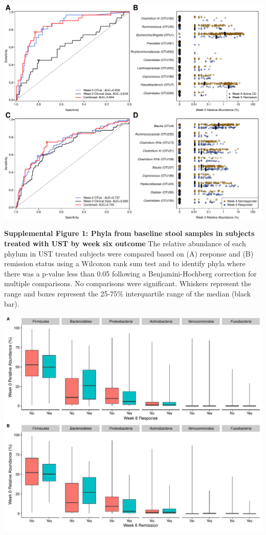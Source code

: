 \documentclass[12pt,]{article}
\begin{document}
\includegraphics{figures/Figure2_wk0Xwk6pred.pdf}

\newpage

\textbf{Supplemental Figure 1: Phyla from baseline stool samples in
subjects treated with UST by week six outcome} The relative abundance of
each phylum in UST treated subjects were compared based on (A) response
and (B) remission status using a Wilcoxon rank sum test and to identify
phyla where there was a p-value less than 0.05 following a
Benjamini-Hochberg correction for multiple comparisons. No comparisons
were significant. Whiskers represent the range and boxes represent the
25-75\% interquartile range of the median (black bar).

\includegraphics{figures/SF1_wk6phyla.pdf}
\end{document}
